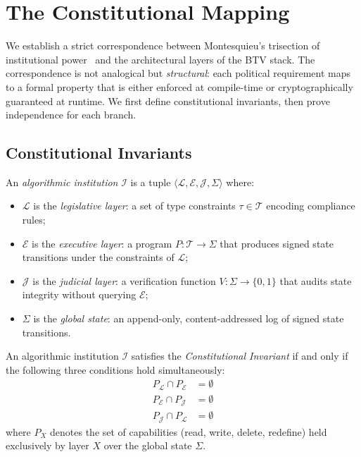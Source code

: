 \section{The Constitutional Mapping}
\label{sec:mapping}

We establish a strict correspondence between Montesquieu's trisection of
institutional power~\cite{montesquieu1748} and the architectural layers
of the BTV stack. The correspondence is not analogical but
\emph{structural}: each political requirement maps to a formal property
that is either enforced at compile-time or cryptographically guaranteed
at runtime. We first define constitutional invariants, then prove
independence for each branch.

\subsection{Constitutional Invariants}
\label{subsec:invariants}

\begin{definition}
\label{def:institution}
An \emph{algorithmic institution} $\mathcal{I}$ is a tuple
$\langle \mathcal{L}, \mathcal{E}, \mathcal{J}, \Sigma \rangle$ where:
\begin{itemize}
  \item $\mathcal{L}$ is the \emph{legislative layer}: a set of type
  constraints $\tau \in \mathcal{T}$ encoding compliance rules;
  \item $\mathcal{E}$ is the \emph{executive layer}: a program
  $P : \mathcal{T} \to \Sigma$ that produces signed state transitions
  under the constraints of $\mathcal{L}$;
  \item $\mathcal{J}$ is the \emph{judicial layer}: a verification
  function $V : \Sigma \to \{0,1\}$ that audits state integrity without
  querying $\mathcal{E}$;
  \item $\Sigma$ is the \emph{global state}: an append-only,
  content-addressed log of signed state transitions.
\end{itemize}
\end{definition}

\begin{definition}
\label{def:invariant}
An algorithmic institution $\mathcal{I}$ satisfies the
\emph{Constitutional Invariant} if and only if the following three
conditions hold simultaneously:
\begin{align}
  P_{\mathcal{L}} \cap P_{\mathcal{E}} &= \emptyset \label{eq:leg-exec} \\
  P_{\mathcal{E}} \cap P_{\mathcal{J}} &= \emptyset \label{eq:exec-jud} \\
  P_{\mathcal{J}} \cap P_{\mathcal{L}} &= \emptyset \label{eq:jud-leg}
\end{align}
where $P_{X}$ denotes the set of capabilities (read, write, delete,
redefine) held exclusively by layer $X$ over the global state $\Sigma$.
\end{definition}

